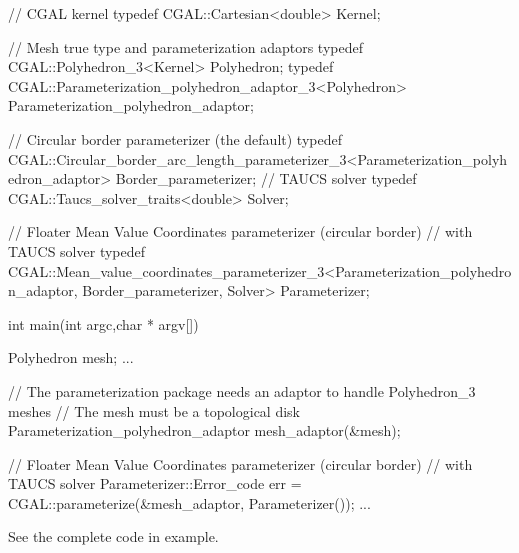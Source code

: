 \begin{ccExampleCode}

// CGAL kernel
typedef CGAL::Cartesian<double>                         Kernel;

// Mesh true type and parameterization adaptors
typedef CGAL::Polyhedron_3<Kernel>                      Polyhedron;
typedef CGAL::Parameterization_polyhedron_adaptor_3<Polyhedron>
                                                        Parameterization_polyhedron_adaptor;

// Circular border parameterizer (the default)
typedef CGAL::Circular_border_arc_length_parameterizer_3<Parameterization_polyhedron_adaptor>
                                                        Border_parameterizer;
// TAUCS solver
typedef CGAL::Taucs_solver_traits<double>               Solver;

// Floater Mean Value Coordinates parameterizer (circular border)
// with TAUCS solver
typedef CGAL::Mean_value_coordinates_parameterizer_3<Parameterization_polyhedron_adaptor,
                                                   Border_parameterizer,
                                                   Solver>
                                                        Parameterizer;

int main(int argc,char * argv[])
{
    Polyhedron mesh;
    ...

    // The parameterization package needs an adaptor to handle Polyhedron_3 meshes
    // The mesh must be a topological disk
    Parameterization_polyhedron_adaptor mesh_adaptor(&mesh);

    // Floater Mean Value Coordinates parameterizer (circular border)
    // with TAUCS solver
    Parameterizer::Error_code err = CGAL::parameterize(&mesh_adaptor, Parameterizer());
    ...
}

\end{ccExampleCode}

See the complete code in  example.

